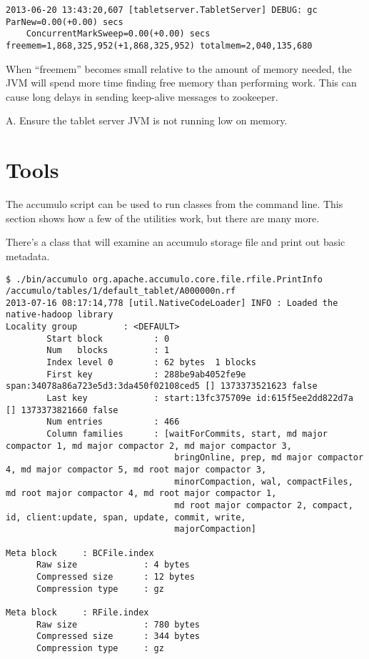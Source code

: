 \begingroup\fontsize{8pt}{8pt}\selectfont\begin{verbatim}
2013-06-20 13:43:20,607 [tabletserver.TabletServer] DEBUG: gc ParNew=0.00(+0.00) secs
    ConcurrentMarkSweep=0.00(+0.00) secs freemem=1,868,325,952(+1,868,325,952) totalmem=2,040,135,680
\end{verbatim}\endgroup

When ``freemem'' becomes small relative to the amount of memory
needed, the JVM will spend more time finding free memory than
performing work.  This can cause long delays in sending keep-alive
messages to zookeeper.

A. Ensure the tablet server JVM is not running low on memory.

\section{Tools}

The accumulo script can be used to run classes from the command line.
This section shows how a few of the utilities work, but there are many
more.

There's a class that will examine an accumulo storage file and print
out basic metadata.  

\begingroup\fontsize{8pt}{8pt}\selectfont\begin{verbatim}
$ ./bin/accumulo org.apache.accumulo.core.file.rfile.PrintInfo /accumulo/tables/1/default_tablet/A000000n.rf
2013-07-16 08:17:14,778 [util.NativeCodeLoader] INFO : Loaded the native-hadoop library
Locality group         : <DEFAULT>
        Start block          : 0
        Num   blocks         : 1
        Index level 0        : 62 bytes  1 blocks
        First key            : 288be9ab4052fe9e span:34078a86a723e5d3:3da450f02108ced5 [] 1373373521623 false
        Last key             : start:13fc375709e id:615f5ee2dd822d7a [] 1373373821660 false
        Num entries          : 466
        Column families      : [waitForCommits, start, md major compactor 1, md major compactor 2, md major compactor 3,
                                 bringOnline, prep, md major compactor 4, md major compactor 5, md root major compactor 3,
                                 minorCompaction, wal, compactFiles, md root major compactor 4, md root major compactor 1,
                                 md root major compactor 2, compact, id, client:update, span, update, commit, write,
                                 majorCompaction]

Meta block     : BCFile.index
      Raw size             : 4 bytes
      Compressed size      : 12 bytes
      Compression type     : gz

Meta block     : RFile.index
      Raw size             : 780 bytes
      Compressed size      : 344 bytes
      Compression type     : gz
\end{verbatim}\endgroup

